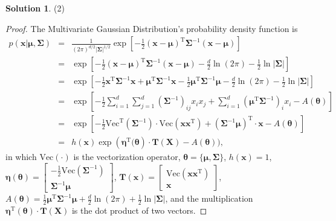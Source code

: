 \documentclass[a4paper,UTF8]{article}
\numberwithin{equation}{section}
\theoremstyle{definition}
\newtheorem*{solution}{Solution}
\begin{document}
\begin{solution}
\item[(2)]
\begin{proof}
The Multivariate Gaussian Distribution's probability density function is
\begin{eqnarray}
p(\bm{x}|\bm{\mu}, \bm{\Sigma})&=&\frac{1}{(2\pi)^{d/2}|\bm{\Sigma|}^{1/2}}\exp[-\frac{1}{2}(\bm{x}-\bm{\mu})^\mathrm{T}\bm{\Sigma}^{-1}(\bm{x}-\bm{\mu})]\nonumber\\
&=&\exp[-\frac{1}{2}(\bm{x}-\bm{\mu})^\mathrm{T}\bm{\Sigma}^{-1}(\bm{x}-\bm{\mu})-\frac{d}{2}\ln(2\pi)-\frac{1}{2}\ln|\bm{\Sigma}|]\nonumber\\
&=&\exp[-\frac{1}{2}\bm{x}^\mathrm{T}\bm{\Sigma}^{-1}\bm{x}+\bm{\mu}^\mathrm{T}\bm{\Sigma}^{-1}\bm{x}-\frac{1}{2}\bm{\mu}^\mathrm{T}\bm{\Sigma}^{-1}\bm{\mu}-\frac{d}{2}\ln(2\pi)-\frac{1}{2}\ln|\bm{\Sigma}|]\nonumber\\
&=&\exp[-\frac{1}{2}\sum_{i=1}^d\sum_{j=1}^d(\bm{\Sigma}^{-1})_{ij}x_ix_j+\sum_{i=1}^d(\bm{\mu}^\mathrm{T}\bm{\Sigma}^{-1})_{i}x_i-A(\bm{\theta})]\nonumber\\
&=&\exp[-\frac{1}{2}\text{Vec}^\mathrm{T}(\bm{\Sigma}^{-1})\cdot\text{Vec}(\bm{x}\bm{x}^\mathrm{T})+(\bm{\Sigma}^{-1}\bm{\mu})^\mathrm{T}\cdot\bm{x}-A(\bm{\theta})]\nonumber\\
&=&h(\bm{x})\exp(\bm{\eta}^\mathrm{T}{(\bm{\theta}})\cdot \bm{T}(\bm{X})-A(\bm{\theta})),
\end{eqnarray}
in which $\text{Vec}(\cdot)$ is the vectorization operator, $\bm{\theta}=\{\bm{\mu}, \bm{\Sigma}\}$, $h(\bm{x})=1$, $\bm{\eta}(\bm{\theta})=\left[\begin{array}{c}-\frac{1}{2}\text{Vec}(\bm{\Sigma}^{-1})\\\bm{\Sigma}^{-1}\bm{\mu}\end{array}\right]$, $\bm{T}(\bm{x})=\left[\begin{array}{c}\text{Vec}(\bm{x}\bm{x}^{\mathrm{T}})\\\bm{x}\end{array}\right]$, $A(\bm{\theta})=\frac{1}{2}\bm{\mu}^\mathrm{T}\bm{\Sigma}^{-1}\bm{\mu}+\frac{d}{2}\ln(2\pi)+\frac{1}{2}\ln|\bm{\Sigma}|$, and the multiplication 
$\bm{\eta}^\mathrm{T}(\bm{\theta})\cdot \bm{T}(\bm{X})$ is the dot product of two vectors.
\end{proof}


\end{solution}
\end{document}

